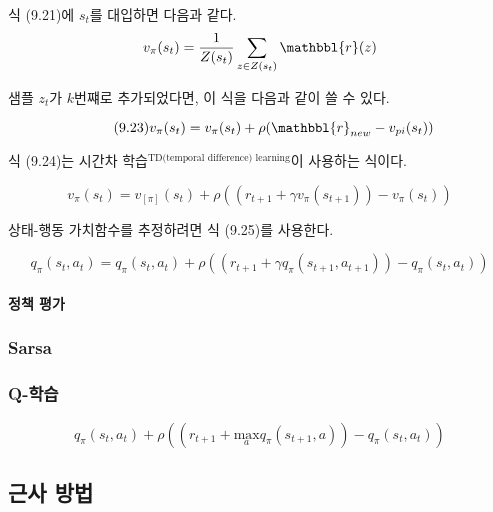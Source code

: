 \documentclass [12pt] {oblivoir}
\let\oldsubsubsection=\subsubsection
\renewcommand{\subsubsection}
{
  \filbreak
  \oldsubsubsection
}
\begin{document}
식 (9.21)에 $s_{t}$를 대입하면 다음과 같다.
\begin{equation*}
  v_{\pi}(s_{t}) = \frac{1}{Z(s_{t})}\sum_{z \in Z(s_t)}\mathbbl{r}(z)
\end{equation*}

샘플 $z_{t}$가 $k$번쨰로 추가되었다면, 이 식을 다음과 같이 쓸 수 있다.

\begin{equation} \tag{9.23}
  v_{\pi}(s_{t}) = v_{\pi}(s_{t}) + \rho(\mathbbl{r}_{new} - v_{pi}(s_{t}))
\end{equation}

식 (9.24)는 시간차 학습$^{\text{TD(temporal difference) learning}}$이 사용하는 식이다.

\begin{equation} \tag{9.24}
  v_{\pi}(s_{t}) = v_[\pi](s_{t}) + \rho((r_{t+1} + \gamma v_{\pi}(s_{t+1})) - v_{\pi}(s_{t}))
\end{equation}

상태-행동 가치함수를 추정하려면 식 (9.25)를 사용한다.

\begin{equation} \tag{9.25}
  q_{\pi}(s_{t}, a_{t}) = q_{\pi}(s_{t}, a_{t}) + \rho((r_{t+1} + \gamma q_{\pi}(s_{t+1}, a_{t+1})) - q_{\pi}(s_{t}, a_{t}))
\end{equation}

\paragraph*{정책 평가}\mbox{}

\vspace{3mm}

\subsubsection{Sarsa}

\subsubsection{Q-학습}

\begin{equation} \tag{9.26}
  q_{\pi}(s_{t}, a_{t}) + \rho((r_{t+1} + \underset{a}{\mathrm{max}}q_{\pi}(s_{t+1}, a)) - q_{\pi}(s_{t}, a_{t}))
\end{equation}

\subsection{근사 방법}
\end{document}
